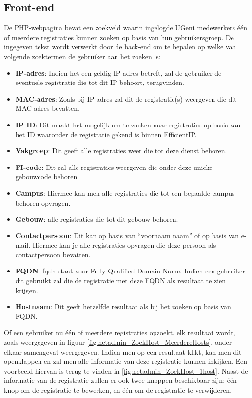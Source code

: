 \subsection{Front-end}
De PHP-webpagina bevat een zoekveld waarin ingelogde UGent medewerkers één of meerdere registraties kunnen zoeken op basis van hun gebruikersgroep. De ingegeven tekst wordt verwerkt door de back-end om te bepalen op welke van volgende zoektermen de gebruiker aan het zoeken is:
\begin{itemize}
    \item \textbf{IP-adres}: Indien het een geldig IP-adres betreft, zal de gebruiker de eventuele registratie die tot dit IP behoort, terugvinden.
    \item \textbf{MAC-adres}: Zoals bij IP-adres zal dit de registratie(s) weergeven die dit MAC-adres bevatten.
    \item \textbf{IP-ID}: Dit maakt het mogelijk om te zoeken naar registraties op basis van het ID waaronder de registratie gekend is binnen EfficientIP. 
    \item \textbf{Vakgroep}: Dit geeft alle registraties weer die tot deze dienst behoren.
    \item \textbf{FI-code}: Dit zal alle registraties weergeven die onder deze unieke gebouwcode behoren.
    \item \textbf{Campus}: Hiermee kan men alle registraties die tot een bepaalde campus behoren opvragen.
    \item \textbf{Gebouw}: alle registraties die tot dit gebouw behoren.
    \item \textbf{Contactpersoon}: Dit kan op basis van “voornaam naam” of op basis van e-mail. Hiermee kan je alle registraties opvragen die deze persoon als contactpersoon bevatten.
    \item \textbf{FQDN}: \acrshort{fqdn} staat voor Fully Qualified Domain Name. Indien een gebruiker dit gebruikt zal die de registratie met deze FQDN als resultaat te zien krijgen.
    \item \textbf{Hostnaam}: Dit geeft hetzelfde resultaat als bij het zoeken op basis van FQDN.
\end{itemize}
Of een gebruiker nu één of meerdere registraties opzoekt, elk resultaat wordt, zoals weergegeven in figuur \ref{fig:netadmin_ZoekHost_MeerdereHosts}, onder elkaar samengevat weergegeven. Indien men op een resultaat klikt, kan men dit openklappen en zal men alle informatie van deze registratie kunnen inkijken. Een voorbeeld hiervan is terug te vinden in \ref{fig:netadmin_ZoekHost_1host}. Naast de informatie van de registratie zullen er ook twee knoppen beschikbaar zijn: één knop om de registratie te bewerken, en één om de registratie te verwijderen.
